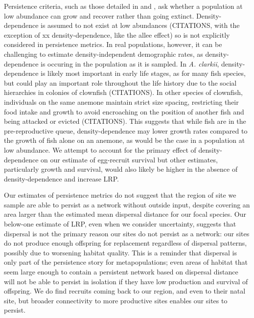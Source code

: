\documentclass[12pt, oneside]{article}   	%
\begin{document}
Persistence criteria, such as those detailed in \cite{hastings_persistence_2006} and \cite{burgess2014beyond}, ask whether a population at low abundance can grow and recover rather than going extinct. Density-dependence is assumed to not exist at low abundances (CITATIONS, with the exception of xx density-dependence, like the allee effect) so is not explicitly considered in persistence metrics. In real populations, however, it can be challenging to estimate density-independent demographic rates, as density-dependence is occuring in the population as it is sampled. In \textit{A. clarkii}, density-dependence is likely most important in early life stages, as for many fish species, but could play an important role throughout the life history due to the social hierarchies in colonies of clownfish (CITATIONS). In other species of clownfish, individuals on the same anemone maintain strict size spacing, restricting their food intake and growth to avoid encroaching on the position of another fish and being attacked or evicted (CITATIONS). This suggests that while fish are in the pre-reproductive queue, density-dependence may lower growth rates compared to the growth of fish alone on an anemone, as would be the case in a population at low abundance. We attempt to account for the primary effect of density-dependence on our estimate of egg-recruit survival but other estimates, particularly growth and survival, would also likely be higher in the absence of density-dependence and increase LRP.

Our estimates of persistence metrics do not suggest that the region of site we sample are able to persist as a network without outside input, despite covering an area larger than the estimated mean dispersal distance for our focal species. Our below-one estimate of LRP, even when we consider uncertainty, suggests that dispersal is not the primary reason our sites do not persist as a network: our sites do not produce enough offspring for replacement regardless of dispersal patterns, possibly due to worsening habitat quality. This is a reminder that dispersal is only part of the persistence story for metapopulations; even areas of habitat that seem large enough to contain a persistent network based on dispersal distance will not be able to persist in isolation if they have low production and survival of offspring. We do find recruits coming back to our region, and even to their natal site, but broader connectivity to more productive sites enables our sites to persist.
\end{document}
